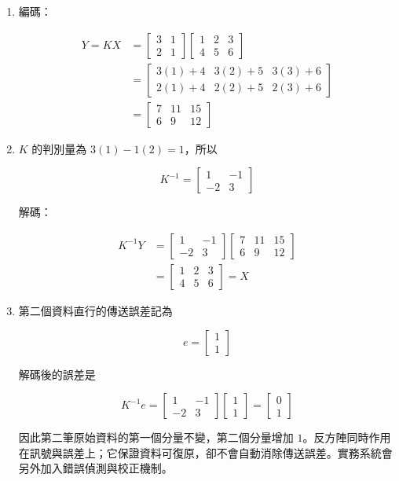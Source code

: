 \documentclass[11pt,a4paper]{article}
\begin{document}
\begin{enumerate}
\def\labelenumi{\arabic{enumi}.}
\item
  編碼：

  \[
  \begin{aligned}
  Y=KX
  &=\begin{bmatrix}3&1\\2&1\end{bmatrix}
  \begin{bmatrix}1&2&3\\4&5&6\end{bmatrix}\\
  &=\begin{bmatrix}
  3(1)+4&3(2)+5&3(3)+6\\
  2(1)+4&2(2)+5&2(3)+6
  \end{bmatrix}\\
  &=\begin{bmatrix}7&11&15\\6&9&12\end{bmatrix}
  \end{aligned}
  \]
\item
  \(K\) 的判別量為 \(3(1)-1(2)=1\)，所以

  \[
  K^{-1}=\begin{bmatrix}1&-1\\-2&3\end{bmatrix}
  \]

  解碼：

  \[
  \begin{aligned}
  K^{-1}Y
  &=\begin{bmatrix}1&-1\\-2&3\end{bmatrix}
  \begin{bmatrix}7&11&15\\6&9&12\end{bmatrix}\\
  &=\begin{bmatrix}1&2&3\\4&5&6\end{bmatrix}=X
  \end{aligned}
  \]
\item
  第二個資料直行的傳送誤差記為

  \[
  e=\begin{bmatrix}1\\1\end{bmatrix}
  \]

  解碼後的誤差是

  \[
  K^{-1}e
  =\begin{bmatrix}1&-1\\-2&3\end{bmatrix}
  \begin{bmatrix}1\\1\end{bmatrix}
  =\begin{bmatrix}0\\1\end{bmatrix}
  \]

  因此第二筆原始資料的第一個分量不變，第二個分量增加 \(1\)。反方陣同時作用在訊號與誤差上；它保證資料可復原，卻不會自動消除傳送誤差。實務系統會另外加入錯誤偵測與校正機制。
\end{enumerate}
\end{document}
